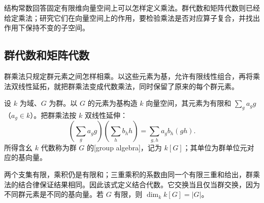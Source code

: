 \ProseParagraphBreak
结构常数回答固定有限维向量空间上可以怎样定义乘法。群代数和矩阵代数则已经给定乘法；研究它们在向量空间上的作用，要检验乘法是否对应算子复合，并找出作用下保持不变的子空间。

\subsection{群代数和矩阵代数}
\label{b2:subsec:1101:03}

群乘法只规定群元素之间怎样相乘。以这些元素为基，允许有限线性组合，再将乘法双线性延拓，就把群乘法变成代数乘法，同时保留了原来的每个群元素。

\begin{definition}\label{b2:def:group-algebra}
	设 \(k\) 为域、\(G\) 为群。以 \(G\) 的元素为基构造 \(k\) 向量空间，其元素为有限和 \(\sum_g a_g g\)（\(a_g\in k\)）。把群乘法按 \(k\) 双线性延伸：
	\[
		\left(\sum_g a_g g\right)\left(\sum_h b_h h\right) =\sum_{g,h}a_gb_h(gh).
	\]
	所得含幺 \(k\) 代数称为群 \(G\) 的[group algebra]，记为 \(k[G]\)；其单位为群单位元对应的基向量。
\end{definition}

两个支集有限，乘积仍是有限和；三重乘积的系数由同一个有限三重和给出，群乘法的结合律保证结果相同。因此该式定义结合代数。它交换当且仅当群交换，因为不同群元素是不同的基向量。若 \(G\) 有限，则 \(\dim_k k[G]=|G|\)。

